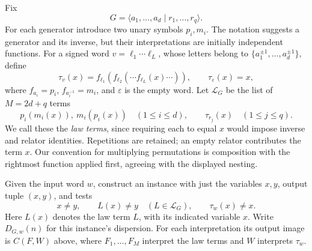 \documentclass[12pt]{article}
\theoremstyle{definition}
\begin{document}
Fix
\[
 G=\langle a_1,\ldots,a_d\mid r_1,\ldots,r_q\rangle.
\]
For each generator introduce two unary symbols $p_i,m_i$. The notation
suggests a generator and its inverse, but their interpretations are
initially independent functions. For a signed word
$v=\ell_1\cdots\ell_L$, whose letters belong to
$\{a_1^{\pm1},\ldots,a_d^{\pm1}\}$, define
\[
 \tau_v(x)=f_{\ell_1}(f_{\ell_2}(\cdots f_{\ell_L}(x)\cdots)),
 \qquad \tau_\varepsilon(x)=x,
\]
where $f_{a_i}=p_i$, $f_{a_i^{-1}}=m_i$, and $\varepsilon$ is the
empty word. Let $\mathcal L_G$ be the list of $M=2d+q$ terms
\[
 p_i(m_i(x)),\ m_i(p_i(x))\quad(1\le i\le d),
 \qquad \tau_{r_j}(x)\quad(1\le j\le q).
\]
We call these the \emph{law terms}, since requiring each to equal $x$
would impose inverse and relator identities. Repetitions are retained;
an empty relator contributes the term $x$.
Our convention for multiplying permutations is composition with the
rightmost function applied first, agreeing with the displayed nesting.

Given the input word $w$, construct an instance with just the variables
$x,y$, output tuple $(x,y)$, and tests
\begin{equation}\label{eq:compiler}
 x\ne y,\qquad L(x)\ne y\quad(L\in\mathcal L_G),\qquad
 \tau_w(x)\ne x.
\end{equation}
Here $L(x)$ denotes the law term $L$, with its indicated variable $x$.
Write $D_{G,w}(n)$ for this instance's dispersion.
For each interpretation its output image is $C(F,W)$ above, where
$F_1,\ldots,F_M$ interpret the law terms and $W$ interprets $\tau_w$.
\end{document}

